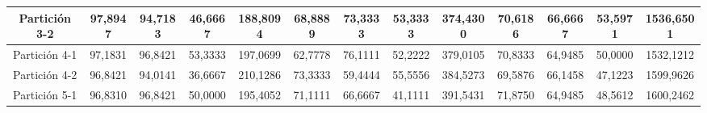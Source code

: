 \documentclass[12pt]{article}
\begin{document}
\begin{table}[H]
{\begin{tabular}{|c|cccc|cccc|cccc|}
Partición 3-2 & \multicolumn{1}{c|}{97,8947}                                                  & \multicolumn{1}{c|}{94,7183}                                                 & \multicolumn{1}{c|}{46,6667} & 188,8094 & \multicolumn{1}{c|}{68,8889}                                                  & \multicolumn{1}{c|}{73,3333}                                                 & \multicolumn{1}{c|}{53,3333} & 374,4300 & \multicolumn{1}{c|}{70,6186}                                                  & \multicolumn{1}{c|}{66,6667}                                                 & \multicolumn{1}{c|}{53,5971} & 1536,6501 \\ \hline
Partición 4-1 & \multicolumn{1}{c|}{97,1831}                                                  & \multicolumn{1}{c|}{96,8421}                                                 & \multicolumn{1}{c|}{53,3333} & 197,0699 & \multicolumn{1}{c|}{62,7778}                                                  & \multicolumn{1}{c|}{76,1111}                                                 & \multicolumn{1}{c|}{52,2222} & 379,0105 & \multicolumn{1}{c|}{70,8333}                                                  & \multicolumn{1}{c|}{64,9485}                                                 & \multicolumn{1}{c|}{50,0000} & 1532,1212 \\ \hline
Partición 4-2 & \multicolumn{1}{c|}{96,8421}                                                  & \multicolumn{1}{c|}{94,0141}                                                 & \multicolumn{1}{c|}{36,6667} & 210,1286 & \multicolumn{1}{c|}{73,3333}                                                  & \multicolumn{1}{c|}{59,4444}                                                 & \multicolumn{1}{c|}{55,5556} & 384,5273 & \multicolumn{1}{c|}{69,5876}                                                  & \multicolumn{1}{c|}{66,1458}                                                 & \multicolumn{1}{c|}{47,1223} & 1599,9626 \\ \hline
Partición 5-1 & \multicolumn{1}{c|}{96,8310}                                                  & \multicolumn{1}{c|}{96,8421}                                                 & \multicolumn{1}{c|}{50,0000} & 195,4052 & \multicolumn{1}{c|}{71,1111}                                                  & \multicolumn{1}{c|}{66,6667}                                                 & \multicolumn{1}{c|}{41,1111} & 391,5431 & \multicolumn{1}{c|}{71,8750}                                                  & \multicolumn{1}{c|}{64,9485}                                                 & \multicolumn{1}{c|}{48,5612} & 1600,2462 \\ \hline

\end{tabular}}
\end{table}
\end{document}
